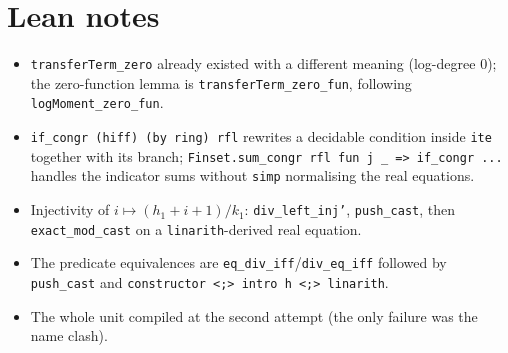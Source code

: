 \documentclass[11pt]{article}
\begin{document}
\section{Lean notes}

\begin{itemize}
\item \texttt{transferTerm\_zero} already existed with a different meaning (log-degree $0$); the
zero-function lemma is \texttt{transferTerm\_zero\_fun}, following \texttt{logMoment\_zero\_fun}.
\item \texttt{if\_congr (hiff) (by ring) rfl} rewrites a decidable condition inside \texttt{ite}
together with its branch; \texttt{Finset.sum\_congr rfl fun j \_ => if\_congr ...} handles the
indicator sums without \texttt{simp} normalising the real equations.
\item Injectivity of $i\mapsto(h_1+i+1)/k_1$: \texttt{div\_left\_inj'}, \texttt{push\_cast},
then \texttt{exact\_mod\_cast} on a \texttt{linarith}-derived real equation.
\item The predicate equivalences are \texttt{eq\_div\_iff}/\texttt{div\_eq\_iff} followed by
\texttt{push\_cast} and \texttt{constructor <;> intro h <;> linarith}.
\item The whole unit compiled at the second attempt (the only failure was the name clash).
\end{itemize}
\end{document}
